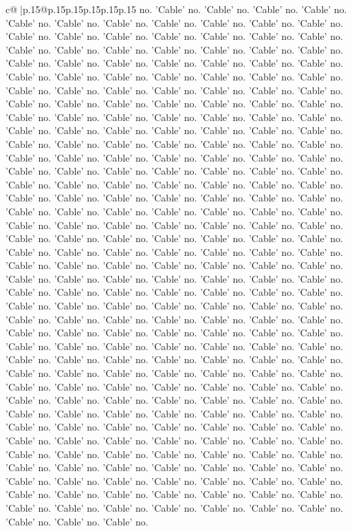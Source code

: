 \documentclass{article}
\begin{document}
{\begin{supertabular}{c@{$\;$}|p{.15\linewidth}@{}p{.15\linewidth}p{.15\linewidth}p{.15\linewidth}p{.15\linewidth}p{.15\linewidth}}
{{{no. 'Cable' no. 'Cable' no. 'Cable' no. 'Cable' no. 'Cable' no. 'Cable' no. 'Cable' no. 'Cable' no. 'Cable' no. 'Cable' no. 'Cable' no. 'Cable' no. 'Cable' no. 'Cable' no. 'Cable' no. 'Cable' no. 'Cable' no. 'Cable' no. 'Cable' no. 'Cable' no. 'Cable' no. 'Cable' no. 'Cable' no. 'Cable' no. 'Cable' no. 'Cable' no. 'Cable' no. 'Cable' no. 'Cable' no. 'Cable' no. 'Cable' no. 'Cable' no. 'Cable' no. 'Cable' no. 'Cable' no. 'Cable' no. 'Cable' no. 'Cable' no. 'Cable' no. 'Cable' no. 'Cable' no. 'Cable' no. 'Cable' no. 'Cable' no. 'Cable' no. 'Cable' no. 'Cable' no. 'Cable' no. 'Cable' no. 'Cable' no. 'Cable' no. 'Cable' no. 'Cable' no. 'Cable' no. 'Cable' no. 'Cable' no. 'Cable' no. 'Cable' no. 'Cable' no. 'Cable' no. 'Cable' no. 'Cable' no. 'Cable' no. 'Cable' no. 'Cable' no. 'Cable' no. 'Cable' no. 'Cable' no. 'Cable' no. 'Cable' no. 'Cable' no. 'Cable' no. 'Cable' no. 'Cable' no. 'Cable' no. 'Cable' no. 'Cable' no. 'Cable' no. 'Cable' no. 'Cable' no. 'Cable' no. 'Cable' no. 'Cable' no. 'Cable' no. 'Cable' no. 'Cable' no. 'Cable' no. 'Cable' no. 'Cable' no. 'Cable' no. 'Cable' no. 'Cable' no. 'Cable' no. 'Cable' no. 'Cable' no. 'Cable' no. 'Cable' no. 'Cable' no. 'Cable' no. 'Cable' no. 'Cable' no. 'Cable' no. 'Cable' no. 'Cable' no. 'Cable' no. 'Cable' no. 'Cable' no. 'Cable' no. 'Cable' no. 'Cable' no. 'Cable' no. 'Cable' no. 'Cable' no. 'Cable' no. 'Cable' no. 'Cable' no. 'Cable' no. 'Cable' no. 'Cable' no. 'Cable' no. 'Cable' no. 'Cable' no. 'Cable' no. 'Cable' no. 'Cable' no. 'Cable' no. 'Cable' no. 'Cable' no. 'Cable' no. 'Cable' no. 'Cable' no. 'Cable' no. 'Cable' no. 'Cable' no. 'Cable' no. 'Cable' no. 'Cable' no. 'Cable' no. 'Cable' no. 'Cable' no. 'Cable' no. 'Cable' no. 'Cable' no. 'Cable' no. 'Cable' no. 'Cable' no. 'Cable' no. 'Cable' no. 'Cable' no. 'Cable' no. 'Cable' no. 'Cable' no. 'Cable' no. 'Cable' no. 'Cable' no. 'Cable' no. 'Cable' no. 'Cable' no. 'Cable' no. 'Cable' no. 'Cable' no. 'Cable' no. 'Cable' no. 'Cable' no. 'Cable' no. 'Cable' no. 'Cable' no. 'Cable' no. 'Cable' no. 'Cable' no. 'Cable' no. 'Cable' no. 'Cable' no. 'Cable' no. 'Cable' no. 'Cable' no. 'Cable' no. 'Cable' no. 'Cable' no. 'Cable' no. 'Cable' no. 'Cable' no. 'Cable' no. 'Cable' no. 'Cable' no. 'Cable' no. 'Cable' no. 'Cable' no. 'Cable' no. 'Cable' no. 'Cable' no. 'Cable' no. 'Cable' no. 'Cable' no. 'Cable' no. 'Cable' no. 'Cable' no. 'Cable' no. 'Cable' no. 'Cable' no. 'Cable' no. 'Cable' no. 'Cable' no. 'Cable' no. 'Cable' no. 'Cable' no. 'Cable' no. 'Cable' no. 'Cable' no. 'Cable' no. 'Cable' no. 'Cable' no. 'Cable' no. 'Cable' no. 'Cable' no. 'Cable' no. 'Cable' no. 'Cable' no. 'Cable' no. 'Cable' no. 'Cable' no. 'Cable' no. 'Cable' no. 'Cable' no. 'Cable' no. 'Cable' no. 'Cable' no. 'Cable' no. 'Cable' no. 'Cable' no. 'Cable' no. 'Cable' no. 'Cable' no. 'Cable' no. 'Cable' no. 'Cable' no. 'Cable' no. 'Cable' no. 'Cable' no. 'Cable' no. 'Cable' no. 'Cable' no. 'Cable' no. 'Cable' no. 'Cable' no. 'Cable' no. 'Cable' no. 'Cable' no. 'Cable' no. 'Cable' no. 'Cable' no. 'Cable' no. 'Cable' no. 'Cable' no. 'Cable' no. 'Cable' no. 'Cable' no. 'Cable' no. 'Cable' no. 'Cable' no. 'Cable' no. 'Cable' no. 'Cable' no. 'Cable' no. 'Cable' no. 'Cable' no. }}}
\end{supertabular}}
\end{document}
